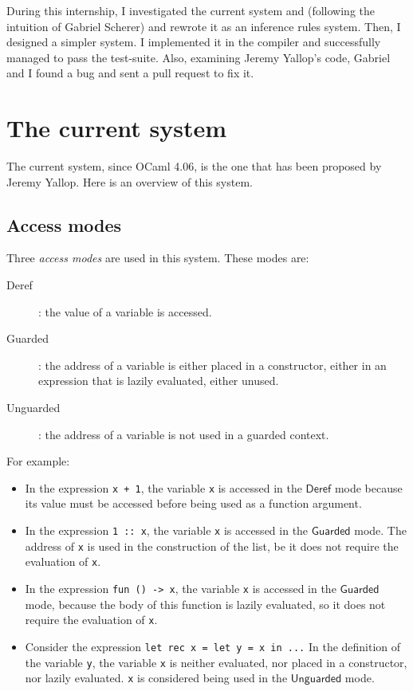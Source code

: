\documentclass{article}
\newcommand{\Deref}{\mathsf{Deref}}
\newcommand{\Unguarded}{\mathsf{Unguarded}}
\newcommand{\Guarded}{\mathsf{Guarded}}
\begin{document}
During this internship, I investigated the current system and (following the
intuition of Gabriel Scherer) and rewrote it as an inference rules system. Then,
I designed a simpler system. I implemented it in the compiler and successfully
managed to pass the test-suite. Also, examining Jeremy Yallop's code, Gabriel
and I found a bug and sent a pull request to fix it.

\section{The current system}
The current system, since OCaml 4.06, is the one that has been proposed by
Jeremy Yallop. Here is an overview of this system.

\subsection{Access modes}
Three \textit{access modes} are used in this system. These modes are:
\begin{description}
  \item[Deref] : the value of a variable is accessed.
  \item[Guarded] : the address of a variable is either placed in a constructor,
    either in an expression that is lazily evaluated, either unused.
  \item[Unguarded] : the address of a variable is not used in a guarded
    context.
\end{description}

For example:
\begin{itemize}
  \item In the expression \lstinline|x + 1|, the variable \lstinline|x| is
    accessed in the $\Deref$ mode because its value must be accessed before
    being used as a function argument.
  \item In the expression \lstinline|1 :: x|, the variable \lstinline|x| is 
    accessed in the $\Guarded$ mode. The address of \lstinline|x| is used in
    the construction of the list, be it does not require the evaluation of
    \lstinline|x|.
  \item In the expression \lstinline|fun () -> x|, the variable \lstinline|x|
    is accessed in the $\Guarded$ mode, because the body of this function is
    lazily evaluated, so it does not require the evaluation of \lstinline|x|.
  \item Consider the expression \lstinline |let rec x = let y = x in ...|
    In the definition of the variable \lstinline|y|, the variable
    \lstinline|x| is neither evaluated, nor placed in a constructor, nor lazily
    evaluated. \lstinline|x| is considered being used in the $\Unguarded$ mode.
\end{itemize}
\end{document}
